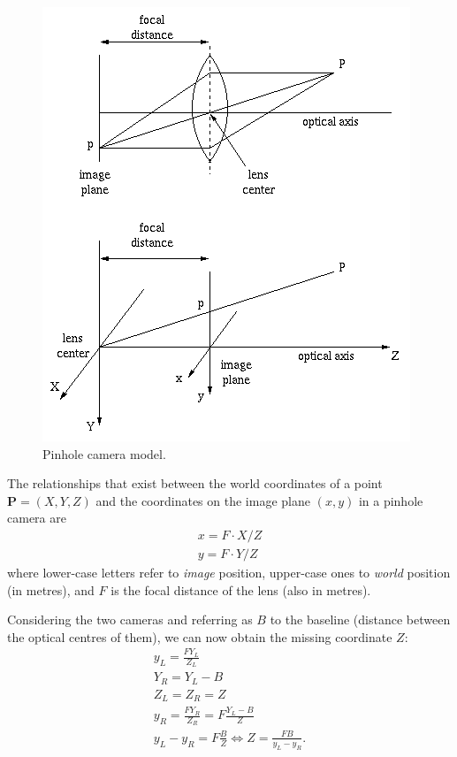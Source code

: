 \begin{figure}
\centering
\includegraphics[scale=0.55]{figures/pinhole}
\caption[Pinhole camera model]{Pinhole camera model.}
\label{img:pinhole}
\end{figure}

The relationships that exist between the world coordinates of a point $\mathbf{P} = (X, Y, Z)$ and the coordinates on the image plane $(x, y)$ in a pinhole camera are
%
\begin{gather}
x = F \cdot X / Z \\
y = F \cdot Y / Z
\end{gather}
%
where lower-case letters refer to \emph{image} position, upper-case ones to \emph{world} position (in metres), and $F$ is the focal distance of the lens (also in metres).


Considering the two cameras and referring as $B$ to the baseline (distance between the optical centres of them), we can now obtain the missing coordinate $Z$:
%
\begin{gather}
y_L = \frac{F Y_L}{Z_L} \\
Y_R = Y_L - B \\
Z_L = Z_R = Z \\
y_R = \frac{F Y_R}{Z_R} = F \frac{Y_L - B}{Z} \\
y_L - y_R = F \frac{B}{Z} \Longleftrightarrow Z = \frac{F B}{y_L - y_R}.
\end{gather}


